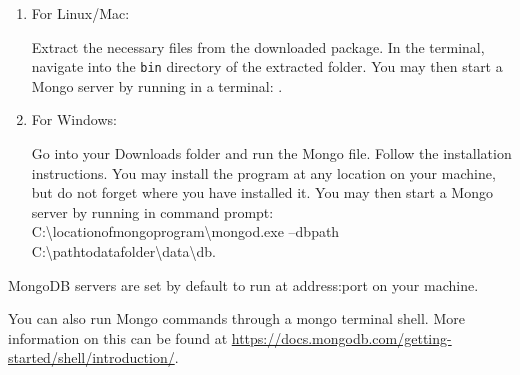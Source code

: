 \begin{enumerate}
\item For Linux/Mac:

Extract the necessary files from the downloaded package.
In the terminal, navigate into the \texttt{bin} directory of the extracted folder.
You may then start a Mongo server by running in a terminal: .

\item For Windows:

Go into your Downloads folder and run the Mongo  file.
Follow the installation instructions.
You may install the program at any location on your machine, but do not forget where you have installed it.
You may then start a Mongo server by running in command prompt: C:\textbackslash locationofmongoprogram\textbackslash mongod.exe --dbpath C:\textbackslash pathtodatafolder\textbackslash data\textbackslash db.
\end{enumerate}

MongoDB servers are set by default to run at address:port  on your machine.

You can also run Mongo commands through a mongo terminal shell.
More information on this can be found at \url{https://docs.mongodb.com/getting-started/shell/introduction/}.
